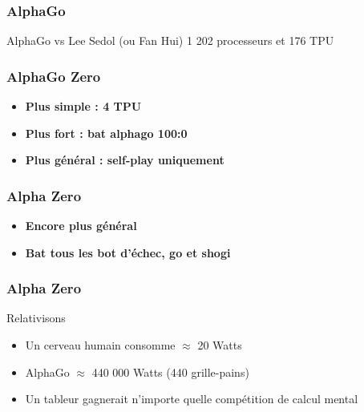 \documentclass{formation}
\begin{document}
\begin{frame}
  \frametitle{AlphaGo}
  AlphaGo vs Lee Sedol (ou Fan Hui)
  \newline
  \huge
  1 202 processeurs et 176 TPU
\end{frame}

\begin{frame}
  \frametitle{AlphaGo Zero}
  \begin{itemize}
  \item \textbf{Plus simple : 4 TPU}
  \item \textbf{Plus fort : bat alphago 100:0}
  \item \textbf{Plus général : self-play uniquement}
  \end{itemize}  
\end{frame}

\begin{frame}
  \frametitle{Alpha Zero}
  \begin{itemize}
  \item \textbf{Encore plus général}
  \item \textbf{Bat tous les bot d'échec, go et shogi}
  \end{itemize}  
\end{frame}

\begin{frame}
  \frametitle{Alpha Zero}
  Relativisons
  \begin{itemize}
  \item Un cerveau humain consomme $\approx$ 20 Watts
  \item AlphaGo $\approx$ 440 000 Watts (440 grille-pains)
  \item Un tableur gagnerait n'importe quelle compétition de calcul mental
  \end{itemize}
\end{frame}
\end{document}
